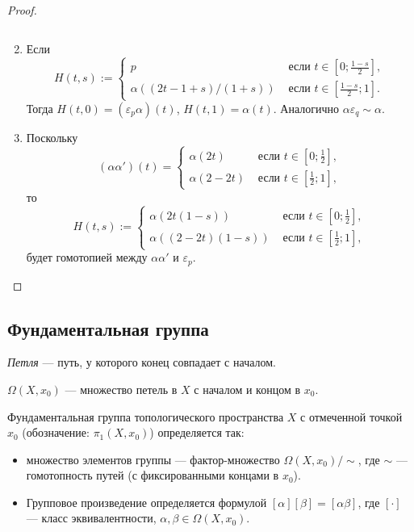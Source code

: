 \documentclass[12pt,a4paper]{article}
\begin{document}
\begin{proof}
\begin{enumerate}
\[                \]
            \item Если
                \[
                    H(t, s) :=
                    \begin{cases}
                        p& \text{ если } t \in \left[0; \frac{1-s}{2}\right],\\
                        \alpha((2t-1+s)/(1+s))& \text{ если } t \in \left[\frac{1-s}{2}; 1\right].
                    \end{cases}
                \]
                Тогда $H(t, 0) = (\varepsilon_p \alpha)(t)$, $H(t, 1) = \alpha(t)$. Аналогично $\alpha \varepsilon_q \sim \alpha$.
            \item Поскольку
                \[
                    (\alpha\alpha')(t) =
                    \begin{cases}
                        \alpha(2t)& \text{ если } t \in \left[0; \frac{1}{2}\right],\\
                        \alpha(2-2t)& \text{ если } t \in \left[\frac{1}{2}; 1\right],
                    \end{cases}
                \]
                то
                \[
                    H(t, s) :=
                    \begin{cases}
                        \alpha(2t(1-s))& \text{ если } t \in \left[0; \frac{1}{2}\right],\\
                        \alpha((2-2t)(1-s))& \text{ если } t \in \left[\frac{1}{2}; 1\right],
                    \end{cases}
                \]
                будет гомотопией между $\alpha\alpha'$ и $\varepsilon_p$.
        \end{enumerate}
    \end{proof}

    \subsection{Фундаментальная группа}

    \begin{definition}
        \emph{Петля} --- путь, у которого конец совпадает с началом.
        
        $\Omega(X, x_0)$ --- множество петель в $X$ с началом и концом в $x_0$.
    \end{definition}

    \begin{definition}
        Фундаментальная группа топологического пространства $X$ с отмеченной точкой $x_0$ (обозначение: $\pi_1(X, x_0)$) определяется так:
        \begin{itemize}
            \item множество элементов группы --- фактор-множество $\Omega(X, x_0)/\sim$, где $\sim$ --- гомотопность путей (с фиксированными концами в $x_0$).
            \item Групповое произведение определяется формулой $[\alpha][\beta] = [\alpha \beta]$, где $[\cdot]$ --- класс эквивалентности, $\alpha, \beta \in \Omega(X, x_0)$.
        \end{itemize}
    \end{definition}
\end{document}
